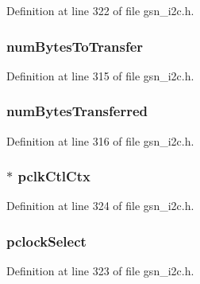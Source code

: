 Definition at line 322 of file gsn\_\-i2c.h.

\hypertarget{a00098_ab3fffdb20c15ad5ef5d0ca8b48de5c58}{
\subsubsection[{numBytesToTransfer}]{ {\bf numBytesToTransfer}}}
\label{a00098_ab3fffdb20c15ad5ef5d0ca8b48de5c58}


Definition at line 315 of file gsn\_\-i2c.h.

\hypertarget{a00098_a3c64997ab8583dffe330d8ffd3097f42}{
\subsubsection[{numBytesTransferred}]{ {\bf numBytesTransferred}}}
\label{a00098_a3c64997ab8583dffe330d8ffd3097f42}


Definition at line 316 of file gsn\_\-i2c.h.

\hypertarget{a00098_a87fd9dda5636bd71a412693b96fed177}{
\subsubsection[{pclkCtlCtx}]{$\ast$ {\bf pclkCtlCtx}}}
\label{a00098_a87fd9dda5636bd71a412693b96fed177}


Definition at line 324 of file gsn\_\-i2c.h.

\hypertarget{a00098_a1111c14058a32aca1ce149f0a4d9cd5b}{
\subsubsection[{pclockSelect}]{ {\bf pclockSelect}}}
\label{a00098_a1111c14058a32aca1ce149f0a4d9cd5b}


Definition at line 323 of file gsn\_\-i2c.h.

